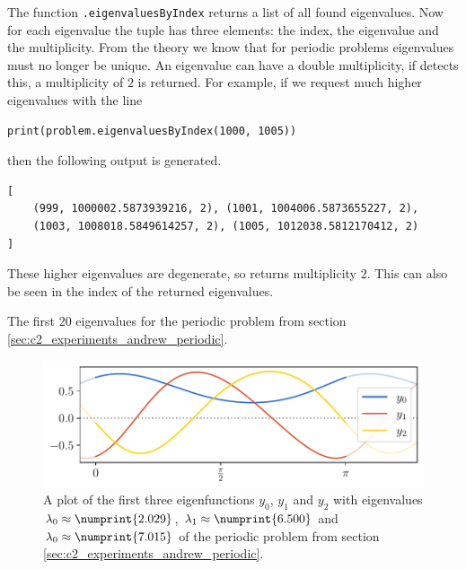 The function \texttt{.eigenvaluesByIndex} returns a list of all found eigenvalues. Now for each eigenvalue the tuple has three elements: the index, the eigenvalue and the multiplicity. From the theory we know that for periodic problems eigenvalues must no longer be unique. An eigenvalue can have a double multiplicity, if \pyslise{} detects this, a multiplicity of $2$ is returned. For example, if we request much higher eigenvalues with the line
\begin{verbatim}
print(problem.eigenvaluesByIndex(1000, 1005))
\end{verbatim}
then the following output is generated.
\begin{verbatim}
[
    (999, 1000002.5873939216, 2), (1001, 1004006.5873655227, 2),
    (1003, 1008018.5849614257, 2), (1005, 1012038.5812170412, 2)
]
\end{verbatim}
These higher eigenvalues are degenerate, so \pyslise{} returns multiplicity $2$. This can also be seen in the index of the returned eigenvalues.

\begin{table}
    \begin{center}
        
    \end{center}
    \caption{The first 20 eigenvalues for the periodic problem from section \ref{sec:c2_experiments_andrew_periodic}.}\label{tab:c2_andrew_periodic}
\end{table}

\begin{figure}
    \begin{center}
        \includegraphics[width=1\textwidth]{img/chapter2/matslise_periodic_eigenfunctions.pdf}
    \end{center}
    \caption{A plot of the first three eigenfunctions $y_0$, $y_1$ and $y_2$ with eigenvalues $\lambda_0\approx\numprint{2.029}$, $\lambda_1\approx\numprint{6.500}$ and $\lambda_0\approx\numprint{7.015}$ of  the periodic problem from section \ref{sec:c2_experiments_andrew_periodic}.}\label{fig:c2_periodic_eigenfunctions}
\end{figure}

